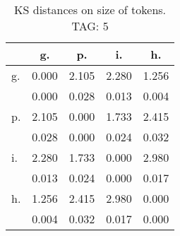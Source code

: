 \begin{table}[h!]
\begin{center}
\begin{tabular}{| l | c | c | c | c |}\hline
 & g. & p. & i. & h. \\\hline
g. & 0.000  & 2.105  & 2.280  & 1.256 \\\hline
 & 0.000  & 0.028  & 0.013  & 0.004 \\\hline
p. & 2.105  & 0.000  & 1.733  & 2.415 \\\hline
 & 0.028  & 0.000  & 0.024  & 0.032 \\\hline
i. & 2.280  & 1.733  & 0.000  & 2.980 \\\hline
 & 0.013  & 0.024  & 0.000  & 0.017 \\\hline
h. & 1.256  & 2.415  & 2.980  & 0.000 \\\hline
 & 0.004  & 0.032  & 0.017  & 0.000 \\\hline
\end{tabular}
\caption{KS distances on size of tokens. TAG: 5}
\end{center}
\end{table}